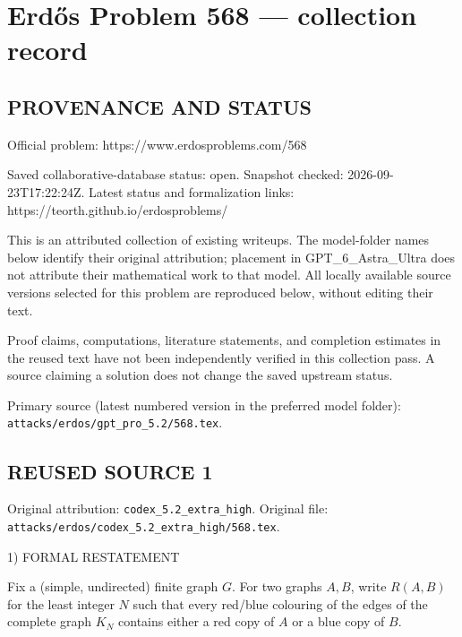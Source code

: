 \section*{Erd\H{o}s Problem 568 --- collection record}

\subsection*{PROVENANCE AND STATUS}
Official problem: https://www.erdosproblems.com/568

Saved collaborative-database status: open.
Snapshot checked: 2026-09-23T17:22:24Z.
Latest status and formalization links: https://teorth.github.io/erdosproblems/

This is an attributed collection of existing writeups. The model-folder names below identify their original attribution; placement in GPT\_6\_Astra\_Ultra does not attribute their mathematical work to that model. All locally available source versions selected for this problem are reproduced below, without editing their text.

Proof claims, computations, literature statements, and completion estimates in the reused text have not been independently verified in this collection pass. A source claiming a solution does not change the saved upstream status.

Primary source (latest numbered version in the preferred model folder): \texttt{attacks/erdos/gpt\_pro\_5.2/568.tex}.

\subsection*{REUSED SOURCE 1}
Original attribution: \texttt{codex\_5.2\_extra\_high}.
Original file: \texttt{attacks/erdos/codex\_5.2\_extra\_high/568.tex}.


1) FORMAL RESTATEMENT

Fix a (simple, undirected) finite graph $G$. For two graphs $A,B$, write $R(A,B)$ for the least integer $N$ such that every red/blue colouring of the edges of the complete graph $K_N$ contains either a red copy of $A$ or a blue copy of $B$.

